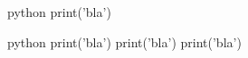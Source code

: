 \begin{codeBlock}{python}
print('bla')
\end{codeBlock}

\begin{codeBlock}[][1,2]{python}
print('bla')
print('bla')
print('bla')
\end{codeBlock}
